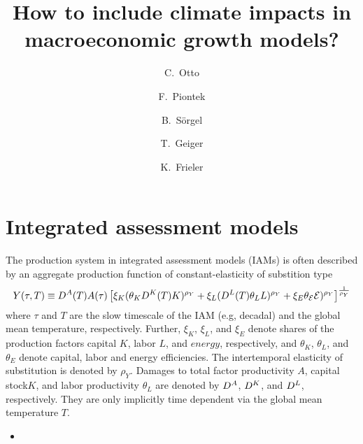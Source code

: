 \documentclass[preprint,3p,authoryear]{elsarticle}
\let\cite\citep
\begin{document}

\begin{frontmatter}

  \title{How to include climate impacts in macroeconomic growth models?}

\author[PIK]{C.~Otto}


\author[PIK]{F.~Piontek}
\author[PIK]{B.~Sörgel}
\author[PIK]{T.~Geiger}
\author[PIK]{K.~Frieler}


\address[PIK]{Potsdam Institute for Climate Impact Research, Potsdam, Germany}




\end{frontmatter}



\section{Integrated assessment models}
\label{sec:set}
The production system in integrated assessment models (IAMs) is often described by an aggregate production function of constant-elasticity of substition type \cite{BAU17} 
\begin{equation}
  \label{eq:CD}
  Y(\tau,T)\equiv D^A(T)A(\tau)\left[\xi_K(\theta_K D^K(T)K)^{\rho_Y}+\xi_L(D^L(T)\theta_LL)^{\rho_Y}+\xi_E\theta_{\mathcal{E}}\mathcal{E})^{\rho_Y}\right]^{\frac{1}{\rho_Y}}
\end{equation}
where $\tau$ and $T$ are the slow timescale of the IAM (e.g, decadal) and the global mean temperature, respectively. Further, $\xi_K$, $\xi_L$, and $\xi_E$ denote shares of the production factors capital $K$, labor $L$, and $energy$, respectively, and $\theta_K$, $\theta_L$, and $\theta_E$ denote capital, labor and energy efficiencies. The intertemporal elasticity of substitution is denoted by $\rho_Y$. Damages to total factor productivity $A$, capital stock$ K$, and labor productivity $\theta_L$ are denoted by $D^A$, $D^K$, and $D^L$, respectively. They are only implicitly time dependent via the global mean temperature $T$. 
\begin{itemize}
\item {}
\end{itemize}
\end{document}
